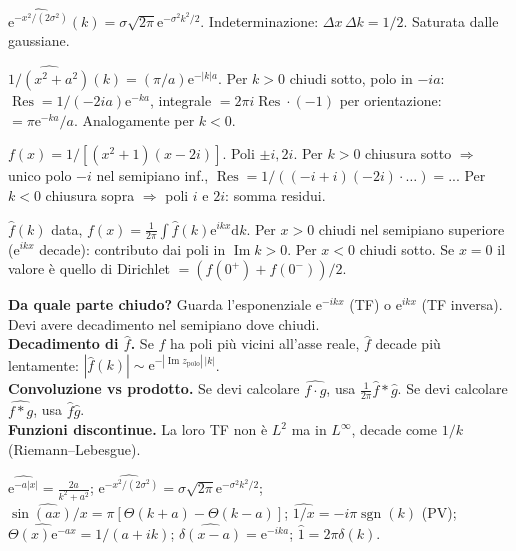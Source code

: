 \documentclass[11pt,a4paper,openany]{book}
\theoremstyle{definition}
\newcommand{\dd}{\mathrm{d}}
\newcommand{\eu}{\mathrm{e}}
\renewcommand{\Im}{\operatorname{Im}}
\DeclareMathOperator{\Res}{Res}
\DeclareMathOperator{\sgn}{sgn}
\begin{document}
\begin{esempio}[Gaussiana]
$\widehat{\eu^{-x^2/(2\sigma^2)}}(k)=\sigma\sqrt{2\pi}\eu^{-\sigma^2 k^2/2}$. Indeterminazione: $\Delta x\,\Delta k=1/2$. Saturata dalle gaussiane.
\end{esempio}

\begin{esempio}[Lorentziana]
$\widehat{1/(x^2+a^2)}(k)=(\pi/a)\eu^{-|k|a}$. Per $k>0$ chiudi sotto, polo in $-ia$: $\Res=1/(-2ia)\eu^{-ka}$, integrale $=2\pi i\Res\cdot(-1)$ per orientazione: $=\pi\eu^{-ka}/a$. Analogamente per $k<0$.
\end{esempio}

\begin{esempio}[Scritto 04/07/2023, Es. 3]
$f(x)=1/[(x^2+1)(x-2i)]$. Poli $\pm i,2i$. Per $k>0$ chiusura sotto $\Rightarrow$ unico polo $-i$ nel semipiano inf., $\Res=1/((-i+i)(-2i)\cdot\dots)=$... Per $k<0$ chiusura sopra $\Rightarrow$ poli $i$ e $2i$: somma residui.
\end{esempio}

\begin{esempio}
$\hat f(k)$ data, $f(x)=\frac{1}{2\pi}\int\hat f(k)\eu^{ikx}\dd k$. Per $x>0$ chiudi nel semipiano superiore ($\eu^{ikx}$ decade): contributo dai poli in $\Im k>0$. Per $x<0$ chiudi sotto.
Se $x=0$ il valore \`e quello di Dirichlet $=(f(0^+)+f(0^-))/2$.
\end{esempio}

\begin{trucco}
\textbf{Da quale parte chiudo?} Guarda l'esponenziale $\eu^{-ikx}$ (TF) o $\eu^{ikx}$ (TF inversa). Devi avere decadimento nel semipiano dove chiudi.\\
\textbf{Decadimento di $\hat f$.} Se $f$ ha poli pi\`u vicini all'asse reale, $\hat f$ decade pi\`u lentamente: $|\hat f(k)|\sim\eu^{-|\Im z_{\text{polo}}|\,|k|}$.\\
\textbf{Convoluzione vs prodotto.} Se devi calcolare $\hat{f\cdot g}$, usa $\frac{1}{2\pi}\hat f*\hat g$. Se devi calcolare $\widehat{f*g}$, usa $\hat f\hat g$.\\
\textbf{Funzioni discontinue.} La loro TF non \`e $L^2$ ma in $L^\infty$, decade come $1/k$ (Riemann--Lebesgue).
\end{trucco}

\begin{formulario}
$\widehat{\eu^{-a|x|}}=\frac{2a}{k^2+a^2}$;
$\widehat{\eu^{-x^2/(2\sigma^2)}}=\sigma\sqrt{2\pi}\eu^{-\sigma^2 k^2/2}$;
$\widehat{\sin(ax)/x}=\pi[\Theta(k+a)-\Theta(k-a)]$;
$\widehat{1/x}=-i\pi\sgn(k)$ (PV);
$\widehat{\Theta(x)\eu^{-ax}}=1/(a+ik)$;
$\widehat{\delta(x-a)}=\eu^{-ika}$;
$\widehat{1}=2\pi\delta(k)$.
\end{formulario}
\end{document}
